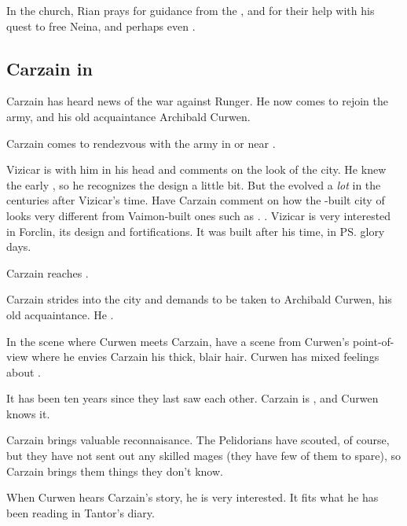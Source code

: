 In the church, Rian prays for guidance from the \sephiroth, and for their help with his quest to free Neina, and perhaps even . 









\subsection{Carzain in \Forclin}
Carzain \Shireyo{} has heard news of the war against Runger. 
He now comes to rejoin the army, and his old acquaintance Archibald Curwen. 

Carzain comes to rendezvous with the army in or near \Forclin. 

Vizicar is with him in his head and comments on the look of the city. 
He knew the early \Ortaicans{}, so he recognizes the design a little bit. 
But the \Ortaicans{} evolved a \emph{lot} in the centuries after Vizicar's time. 
Have Carzain comment on how the \Ortaican-built city of \Forclin looks very different from Vaimon-built ones such as \Malcur. 
. 
Vizicar is very interested in Forclin, its design and fortifications. 
It was built after his time, in \ps{\Ortaica} glory days.

Carzain reaches \Forclin. 

Carzain strides into the city and demands to be taken to Archibald Curwen, his old acquaintance. 
He . 

In the scene where Curwen meets Carzain, have a scene from Curwen's point-of-view where he envies Carzain his thick, blair hair. 
Curwen has mixed feelings about . 

It has been ten years since they last saw each other. 
Carzain is , and Curwen knows it. 

Carzain brings valuable reconnaisance. 
The Pelidorians have scouted, of course, but they have not sent out any skilled mages (they have few of them to spare), so Carzain brings them things they don't know. 

When Curwen hears Carzain's story, he is very interested. 
It fits what he has been reading in Tantor's diary. 

